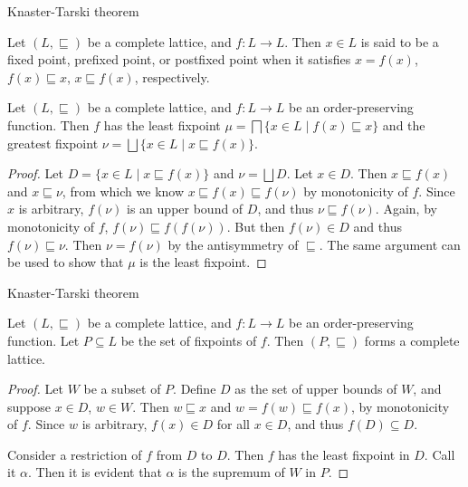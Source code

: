 \documentclass[9pt]{beamer}
\begin{document}
\begin{frame}{Knaster-Tarski theorem}
  \begin{definition}
    Let $(L,\sqsubseteq)$ be a complete lattice, and $f : L \to L$.
    Then $x \in L$ is said to be a fixed point, prefixed point, or postfixed point when
    it satisfies $x = f(x)$, $f(x) \sqsubseteq x$, $x \sqsubseteq f(x)$, respectively.
  \end{definition}

  \begin{lemma}
    Let $(L,\sqsubseteq)$ be a complete lattice, and $f : L \to L$ be an order-preserving function.
    Then $f$ has the least fixpoint $\mu = \bigsqcap \{x \in L \mid f(x) \sqsubseteq x\}$
    and the greatest fixpoint $\nu = \bigsqcup \{x \in L \mid x \sqsubseteq f(x)\}$.
  \end{lemma}
  \begin{proof}
    Let $D = \{x \in L \mid x \sqsubseteq f(x)\}$ and $\nu = \bigsqcup D$.
    Let $x \in D$.
    Then $x \sqsubseteq f(x)$ and $x \sqsubseteq \nu$, from which we know $x \sqsubseteq f(x) \sqsubseteq f(\nu)$ by monotonicity of $f$.
    Since $x$ is arbitrary, $f(\nu)$ is an upper bound of $D$, and thus $\nu \sqsubseteq f(\nu)$.
    Again, by monotonicity of $f$, $f(\nu) \sqsubseteq f(f(\nu))$.
    But then $f(\nu) \in D$ and thus $f(\nu) \sqsubseteq \nu$.
    Then $\nu = f(\nu)$ by the antisymmetry of $\sqsubseteq$.
    The same argument can be used to show that $\mu$ is the least fixpoint.
  \end{proof}
\end{frame}

\begin{frame}{Knaster-Tarski theorem}
  \begin{theorem}
    Let $(L,\sqsubseteq)$ be a complete lattice, and $f : L \to L$ be an order-preserving function. Let $P \subseteq L$ be the set of fixpoints of $f$. Then $(P, \sqsubseteq)$ forms a complete lattice.
  \end{theorem}
  \begin{proof}
    Let $W$ be a subset of $P$.
    Define $D$ as the set of upper bounds of $W$, and suppose $x \in D$, $w \in W$.
    Then $w \sqsubseteq x$ and $w = f(w) \sqsubseteq f(x)$, by monotonicity of $f$.
    Since $w$ is arbitrary, $f(x) \in D$ for all $x \in D$, and thus $f(D) \subseteq D$.

    Consider a restriction of $f$ from $D$ to $D$.
    Then $f$ has the least fixpoint in $D$. Call it $\alpha$.
    Then it is evident that $\alpha$ is the supremum of $W$ in $P$.
  \end{proof}
\end{frame}
\end{document}
